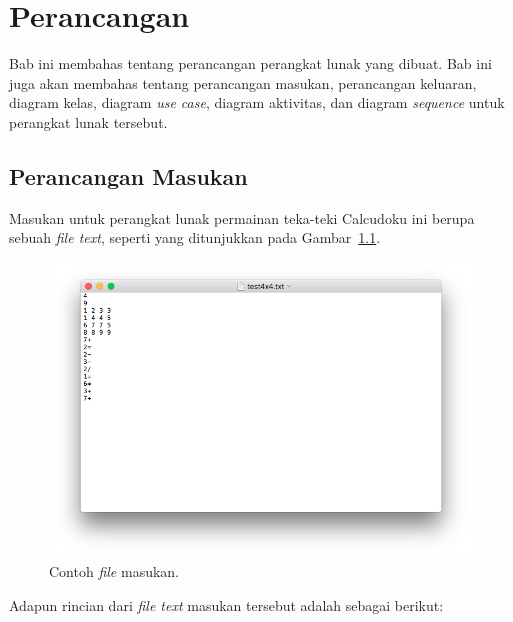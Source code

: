 \chapter{Perancangan}
\label{chap:perancangan}

Bab ini membahas tentang perancangan perangkat lunak yang dibuat. Bab ini juga akan membahas tentang perancangan masukan, perancangan keluaran, diagram kelas, diagram \textit{use case}, diagram aktivitas, dan diagram \textit{sequence} untuk perangkat lunak tersebut.

\section{Perancangan Masukan}
\label{sec:perancanganmasukan}

Masukan untuk perangkat lunak permainan teka-teki Calcudoku ini berupa sebuah \textit{file text}, seperti yang ditunjukkan pada Gambar~\ref{fig:perancanganmasukan}.

\begin{figure}
\centering
\captionsetup{justification=centering}
\includegraphics[scale=0.5]{Gambar/Perancangan/PerancanganInput.png}
\caption[Contoh \textit{file} masukan.]{Contoh \textit{file} masukan.}
\label{fig:perancanganmasukan}
\end{figure}

Adapun rincian dari \textit{file text} masukan tersebut adalah sebagai berikut:

